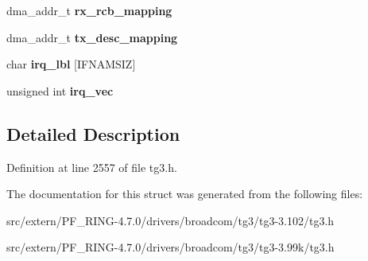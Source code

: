 \begin{DoxyCompactItemize}
\item 
\hypertarget{structtg3__napi_a6f65a7bedb6f949a50d89437278ff2b1}{
dma\_\-addr\_\-t {\bfseries rx\_\-rcb\_\-mapping}}
\label{structtg3__napi_a6f65a7bedb6f949a50d89437278ff2b1}

\item 
\hypertarget{structtg3__napi_a7150e12cd6ef7d7adc8b34f9494e4d96}{
dma\_\-addr\_\-t {\bfseries tx\_\-desc\_\-mapping}}
\label{structtg3__napi_a7150e12cd6ef7d7adc8b34f9494e4d96}

\item 
\hypertarget{structtg3__napi_a38f926538d9af3839a4ae4aeb3a77e8c}{
char {\bfseries irq\_\-lbl} \mbox{[}IFNAMSIZ\mbox{]}}
\label{structtg3__napi_a38f926538d9af3839a4ae4aeb3a77e8c}

\item 
\hypertarget{structtg3__napi_a412771c4c4eff3e4902252f82e34ba94}{
unsigned int {\bfseries irq\_\-vec}}
\label{structtg3__napi_a412771c4c4eff3e4902252f82e34ba94}

\end{DoxyCompactItemize}


\subsection{Detailed Description}


Definition at line 2557 of file tg3.h.



The documentation for this struct was generated from the following files:\begin{DoxyCompactItemize}
\item 
src/extern/PF\_\-RING-\/4.7.0/drivers/broadcom/tg3/tg3-\/3.102/tg3.h\item 
src/extern/PF\_\-RING-\/4.7.0/drivers/broadcom/tg3/tg3-\/3.99k/tg3.h\end{DoxyCompactItemize}
